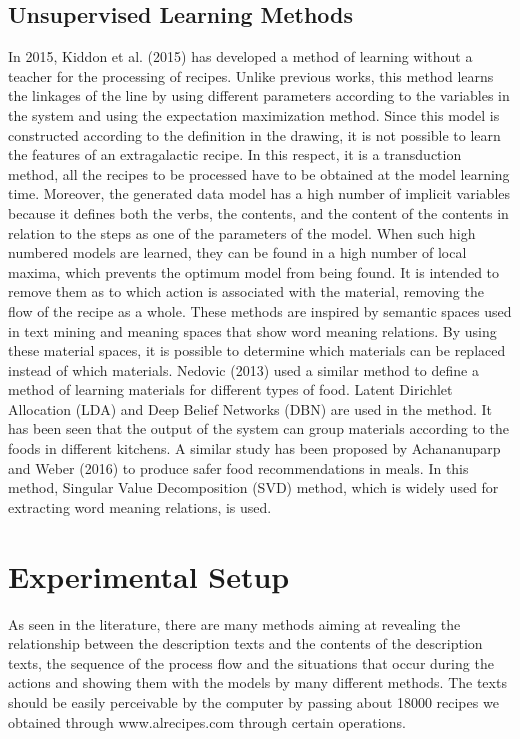 \subsection{Unsupervised Learning Methods}
In 2015, Kiddon et al. (2015) has developed a method of learning without a teacher for the processing of recipes. Unlike previous works, this method learns the linkages of the line by using different parameters according to the variables in the system and using the expectation maximization method. Since this model is constructed according to the definition in the drawing, it is not possible to learn the features of an extragalactic recipe. In this respect, it is a transduction method, all the recipes to be processed have to be obtained at the model learning time. Moreover, the generated data model has a high number of implicit variables because it defines both the verbs, the contents, and the content of the contents in relation to the steps as one of the parameters of the model. When such high numbered models are learned, they can be found in a high number of local maxima, which prevents the optimum model from being found.
It is intended to remove them as to which action is associated with the material, removing the flow of the recipe as a whole. These methods are inspired by semantic spaces used in text mining and meaning spaces that show word meaning relations. By using these material spaces, it is possible to determine which materials can be replaced instead of which materials. Nedovic (2013) used a similar method to define a method of learning materials for different types of food. Latent Dirichlet Allocation (LDA) and Deep Belief Networks (DBN) are used in the method. It has been seen that the output of the system can group materials according to the foods in different kitchens. A similar study has been proposed by Achananuparp and Weber (2016) to produce safer food recommendations in meals. In this method, Singular Value Decomposition (SVD) method, which is widely used for extracting word meaning relations, is used.

\section{Experimental Setup}
As seen in the literature, there are many methods aiming at revealing the relationship between the description texts and the contents of the description texts, the sequence of the process flow and the situations that occur during the actions and showing them with the models by many different methods. The texts should be easily perceivable by the computer by passing about 18000 recipes we obtained through www.alrecipes.com through certain operations.

